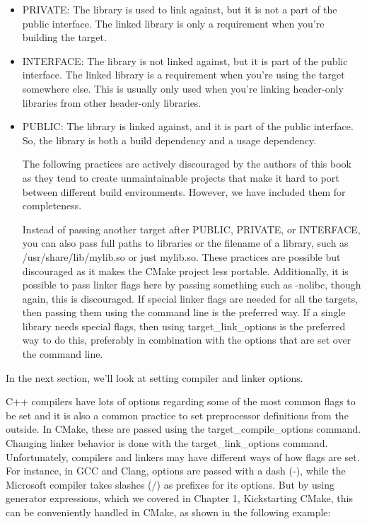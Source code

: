 \begin{itemize}
\item 
PRIVATE: The library is used to link against, but it is not a part of the public interface. The linked library is only a requirement when you're building the target.

\item 
INTERFACE: The library is not linked against, but it is part of the public interface. The linked library is a requirement when you're using the target somewhere else. This is usually only used when you're linking header-only libraries from other header-only libraries.

\item 
PUBLIC: The library is linked against, and it is part of the public interface. So, the library is both a build dependency and a usage dependency.

\begin{tcolorbox}[colback=blue!5!white,colframe=blue!75!black,title=Attention ——{} Bad Practices]
The following practices are actively discouraged by the authors of this book as they tend to create unmaintainable projects that make it hard to port between different build environments. However, we have included them for completeness.

Instead of passing another target after PUBLIC, PRIVATE, or INTERFACE, you can also pass full paths to libraries or the filename of a library, such as  /usr/share/lib/mylib.so or just mylib.so. These practices are possible but discouraged as it makes the CMake project less portable. Additionally, it is possible to pass linker flags here by passing something such as -nolibc, though again, this is discouraged. If special linker flags are needed for all the targets, then passing them using the command line is the preferred way. If a single library needs special flags, then using target\_link\_options is the preferred way to do this, preferably in combination with the options that are set over the command line.
\end{tcolorbox}
\end{itemize}

In the next section, we'll look at setting compiler and linker options.


C++ compilers have lots of options regarding some of the most common flags to be set and it is also a common practice to set preprocessor definitions from the outside. In CMake, these are passed using the target\_compile\_options command. Changing linker behavior is done with the target\_link\_options command. Unfortunately, compilers and linkers may have different ways of how flags are set. For instance, in GCC and Clang, options are passed with a dash (-), while the Microsoft compiler takes slashes (/) as prefixes for its options. But by using generator expressions, which we covered in Chapter 1, Kickstarting CMake, this can be conveniently handled in CMake, as shown in the following example:


